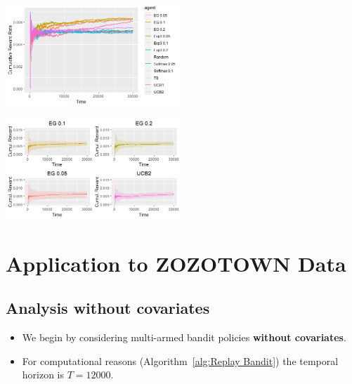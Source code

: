 \documentclass[a0,portrait]{a0poster}
\begin{document}
\begin{multicols}{2}
\begin{center}
    \includegraphics[width=0.49\textwidth]{./figures/SIM-all.png}
    \label{fig:SIM-all}
\end{center}

\begin{center}
    \includegraphics[width=0.49\textwidth]{./figures/SIM-best.png}
    \label{fig:SIM-best}
\end{center}


\color{DarkRed}
\section*{Application to ZOZOTOWN Data}
\color{Black}

\subsection*{Analysis without covariates}

\begin{itemize}
    \item We begin by considering multi-armed bandit policies \textbf{without covariates}.
    
    \item For computational reasons (Algorithm~\ref{alg:Replay Bandit}) the temporal horizon is $T = 12000$.
\end{itemize}




\end{multicols}
\end{document}
